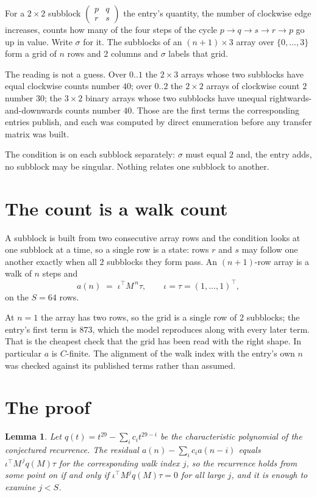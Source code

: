 \documentclass[11pt,a4paper]{article}
\theoremstyle{plain}
\newtheorem{lemma}[theorem]{Lemma}
\theoremstyle{definition}
\begin{document}
For a $2\times2$ subblock $\begin{pmatrix}p&q\\r&s\end{pmatrix}$ the
entry's quantity, the number of clockwise edge increases, counts how many of the four steps of the cycle $p\to q\to s\to r\to p$ go up in value. Write $\sigma$ for it. The subblocks of an
$(n+1)\times3$ array over $\{0,\dots,3\}$ form a grid of $n$ rows and $2$
columns and $\sigma$ labels that grid.

The reading is not a guess. Over $0..1$ the $2\times3$ arrays whose two subblocks have equal
clockwise counts number $40$; over $0..2$ the $2\times2$ arrays of clockwise count $2$ number
$30$; the $3\times2$ binary arrays whose two subblocks have unequal rightwards-and-downwards
counts number $40$. Those are the first terms the corresponding entries publish, and each was
computed by direct enumeration before any transfer matrix was built.

The condition is on each subblock separately: $\sigma$ must equal $2$ and, the entry adds, no subblock may be singular. Nothing
relates one subblock to another.

\section{The count is a walk count}

A subblock is built from two consecutive array rows and the condition looks
at one subblock at a time, so a single row is a state: rows $r$ and $s$ may follow one another
exactly when all $2$ subblocks they form pass. An $(n+1)$-row array is a walk of $n$ steps and
\[
a(n)\;=\;\iota^{\!\top}M^{\,n}\tau,\qquad\iota=\tau=(1,\dots,1)^{\!\top},
\]
on the $S=64$ rows.

At $n=1$ the array has two rows, so the grid is a single row of $2$
subblocks; the entry's first term is $873$, which the model
reproduces along with every later term. That is the cheapest check that the grid has been read
with the right shape.
In particular $a$ is $C$-finite. The alignment of the walk index with the entry's own $n$ was
checked against its published terms rather than assumed.

\section{The proof}

\begin{lemma}\label{lem:crit}
Let $q(t)=t^{29}-\sum_i c_it^{29-i}$ be the characteristic polynomial of the
conjectured recurrence. The residual $a(n)-\sum_ic_ia(n-i)$ equals
$\iota^{\!\top}M^{\,j}q(M)\tau$ for the corresponding walk index $j$, so the recurrence
holds from some point on if and only if $\iota^{\!\top}M^{j}q(M)\tau=0$ for all large $j$,
and it is enough to examine $j<S$.
\end{lemma}
\end{document}
